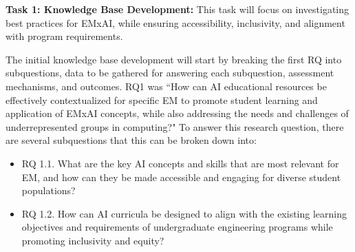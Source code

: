 \documentclass[11pt]{article}
\begin{document}
\begin{tcolorbox}[colback=mycmykcolor, colframe=black, boxrule=1pt, coltext=black]
\textbf{Task 1: Knowledge Base Development:} This task will focus on investigating best practices for EMxAI, while ensuring accessibility, inclusivity, and alignment with program requirements.
\end{tcolorbox}


The initial knowledge base development will start by breaking the first RQ into subquestions, data to be gathered for answering each subquestion, assessment mechanisms, and outcomes. 
RQ1 was ``How can AI educational resources be effectively contextualized for specific EM
to promote student learning and application of EMxAI concepts, while also addressing
the needs and challenges of underrepresented groups in computing?"
To answer this research question, there are several subquestions that this can be broken down into:
\begin{itemize}

\item[] RQ 1.1. What are the key AI concepts and skills that are most relevant for EM, and how can they be made accessible and engaging for diverse student populations?
\item[] RQ 1.2. How can AI curricula be designed to align with the existing learning objectives and requirements of undergraduate engineering programs while promoting inclusivity and equity?
\end{itemize}
\end{document}
